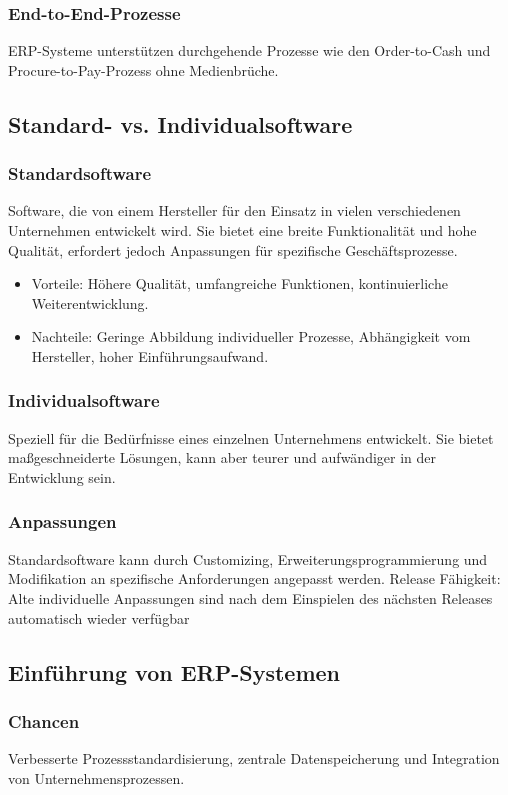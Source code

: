     \subsubsection*{End-to-End-Prozesse}
        ERP-Systeme unterstützen durchgehende Prozesse wie den Order-to-Cash und Procure-to-Pay-Prozess ohne Medienbrüche.

\subsection{Standard- vs. Individualsoftware}
    \subsubsection*{Standardsoftware}
        Software, die von einem Hersteller für den Einsatz in vielen verschiedenen Unternehmen entwickelt wird. Sie bietet eine breite Funktionalität und hohe Qualität, erfordert jedoch Anpassungen für spezifische Geschäftsprozesse.
        \begin{itemize}
            \item Vorteile: Höhere Qualität, umfangreiche Funktionen, kontinuierliche Weiterentwicklung.
            \item Nachteile: Geringe Abbildung individueller Prozesse, Abhängigkeit vom Hersteller, hoher Einführungsaufwand.
        \end{itemize}
    \subsubsection*{Individualsoftware}
        Speziell für die Bedürfnisse eines einzelnen Unternehmens entwickelt. Sie bietet maßgeschneiderte Lösungen, kann aber teurer und aufwändiger in der Entwicklung sein.
    \subsubsection*{Anpassungen}
        Standardsoftware kann durch Customizing, Erweiterungsprogrammierung und Modifikation an spezifische Anforderungen angepasst werden. Release Fähigkeit: Alte individuelle Anpassungen sind nach dem Einspielen des nächsten Releases automatisch wieder verfügbar

\subsection{Einführung von ERP-Systemen}
    \subsubsection*{Chancen}
        Verbesserte Prozessstandardisierung, zentrale Datenspeicherung und Integration von Unternehmensprozessen.
